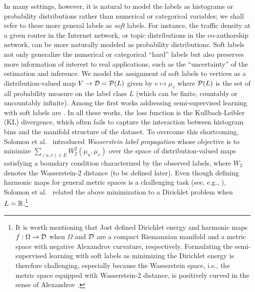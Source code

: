 \documentclass[letterpaper]{article} %
\begin{document}
In many settings, however, it is natural to model the labels as histograms or probability distributions rather than numerical or categorical variables; we shall refer to these more general labels as \textit{soft} labels. For instance, the traffic density at a given router in the Internet network, or topic distributions in the co-authorship network, can be more naturally modeled as probability distributions. Soft labels not only generalize the numerical or categorical ``hard'' labels but also preserves more information of interest to real applications, such as the ``uncertainty'' of the estimation and inference. We model the assignment of soft labels to vertices as a distribution-valued map $V\to \D=\P(L)$ given by $v\mapsto \mu_v$ where $\P(L)$ is the set of all probability measure on the label class $L$ (which can be finite, countably or uncountably infinite). Among the first works addressing semi-supervised learning with soft labels are \cite{Distribution_Propagation1,Distribution_Propagation2,SSL_Measure_Propagation}.  In all these works, the loss function is the Kullback-Leibler (KL) divergence, which often fails to capture the interaction between histogram bins and the manifold structure of the dataset. To overcome this shortcoming, Solomon et al.\ \cite{Solomon:2014} introduced \textit{Wasserstein label propagation} whose objective is to minimize $\sum_{(u, v)\in E}W_2^2(\mu_u,\mu_v)$ over the space of distribution-valued maps satisfying a boundary condition characterized by the observed labels, where $W_2$ denotes the Wasserstein-2 distance (to be defined later). Even though defining harmonic maps for general metric spaces is a challenging task (see, e.g., \cite{Dirichlet_Wasserstein}), Solomon et al.\ \cite{Solomon:2014} related the above minimization to a Dirichlet problem when $L=\R$.\footnote{It is worth mentioning that Jost \cite{Jost} defined Dirichlet energy and  harmonic maps $f: \Omega\to \D$ when $\Omega$ and $\D$ are a compact Riemannian manifold and a metric space with negative Alexandrov curvature, respectively.  Formulating the semi-supervised learning with soft labels as minimizing the Dirichlet energy is therefore challenging, especially because the Wasserstein space, i.e.,  the metric space equipped with Wasserstein-2 distance, is positively curved in the sense of Alexandrov \cite [Section 7.3]{ambrosio2005gradient}. }
\end{document}
